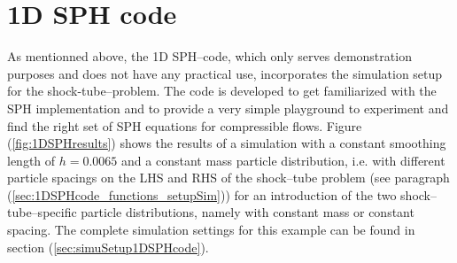 \documentclass{report}
\begin{document}
\section{1D SPH code}
\label{sec:1DSPHcodeResults}
As mentionned above, the 1D SPH--code, which only serves demonstration purposes and does not have any practical use, incorporates the simulation setup for the shock-tube--problem. The code is developed to get familiarized with the SPH implementation and to provide a very simple playground to experiment and find the right set of SPH equations for compressible flows. Figure (\ref{fig:1DSPHresults}) shows the results of a simulation with a constant smoothing length of $h=0.0065$ and a constant mass particle distribution, i.e. with different particle spacings on the LHS and RHS of the shock--tube problem (see paragraph (\ref{sec:1DSPHcode_functions_setupSim})) for an introduction of the two shock--tube--specific particle distributions, namely with constant mass or constant spacing. The complete simulation settings for this example can be found in section (\ref{sec:simuSetup1DSPHcode}). 
\end{document}
